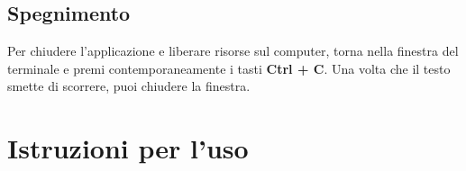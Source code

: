 \documentclass[11pt,a4paper]{article}
\begin{document}
\subsection{Spegnimento}
Per chiudere l'applicazione e liberare risorse sul computer, torna nella finestra del terminale e premi contemporaneamente i tasti \textbf{Ctrl + C}. Una volta che il testo smette di scorrere, puoi chiudere la finestra.

\newpage

\section{Istruzioni per l'uso}


\newpage
\end{document}
